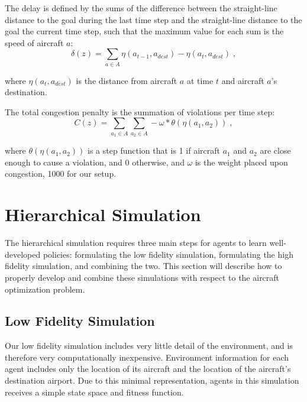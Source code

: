 \documentclass{aamas2014}
\begin{document}
The delay is defined by the sums of the difference between the straight-line distance to the goal during the last time step and the straight-line distance to the goal the current time step, such that the maximum value for each sum is the speed of aircraft $a$:
%
\begin{equation} \label{eq:DistanceReward}
\delta(z) = \displaystyle\sum\limits_{a \in A} \eta(a_{t-1},a_{dest}) - \eta(a_{t},a_{dest})\;,
\end{equation}

where $\eta(a_{t},a_{dest})$ is the distance from aircraft $a$ at time $t$ and aircraft $a$'s destination.

The total congestion penalty is the summation of violations per time step:
%
\begin{equation} \label{eq:CongestionReward}
C(z) = \displaystyle\sum\limits_{a_1 \in A} \displaystyle\sum\limits_{a_2 \in A} -\omega * \theta(\eta(a_1,a_2))\;,
\end{equation}

where $\theta(\eta(a_1,a_2))$ is a step function that is 1 if aircraft $a_1$ and $a_2$ are close enough to cause a violation, and 0 otherwise, and $\omega$ is the weight placed upon congestion, 1000 for our setup.

\section{Hierarchical Simulation}

The hierarchical simulation requires three main steps for agents to learn well-developed policies: formulating the low fidelity simulation, formulating the high fidelity simulation, and combining the two. This section will describe how to properly develop and combine these simulations with respect to the aircraft optimization problem.

\subsection{Low Fidelity Simulation}

Our low fidelity simulation includes very little detail of the environment, and is therefore very computationally inexpensive. Environment information for each agent includes only the location of its aircraft and the location of the aircraft's destination airport. Due to this minimal representation, agents in this simulation receives a simple state space and fitness function.
\end{document}
